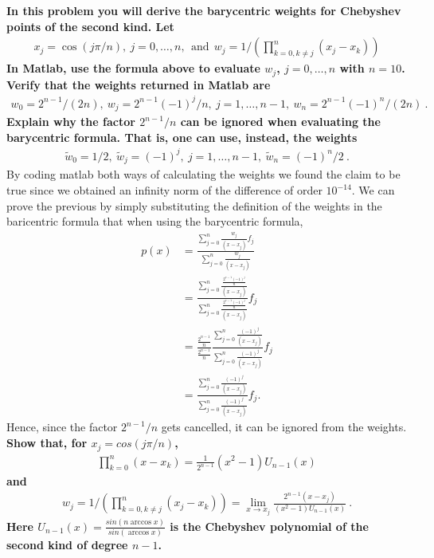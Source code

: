 \textbf{In this problem you will derive the barycentric weights for Chebyshev points of the second kind. Let}
\begin{align*}
x_j = \cos(j\pi /n),~j = 0,\dots,n,~~\text{and}~~w_j = 1/ \left( \prod_{k=0,k \neq j}^n (x_j - x_k) \right)
\end{align*}
\textbf{In Matlab, use the formula above to evaluate $w_j$, $j = 0, \dots, n$ with $n = 10$. Verify that the weights returned in Matlab are}
\begin{align}
w_0 = 2^{n-1}/(2n),~w_j = 2^{n-1}(-1)^j/n,~j = 1,\dots,n-1,~w_n = 2^{n-1}(-1)^n/(2n)~.
\end{align} 
\textbf{Explain why the factor $2^{n-1}/n$ can be ignored when evaluating the barycentric formula. That is, one can use, instead, the weights}
\begin{align*}
\tilde{w}_0 = 1/2,~\tilde{w}_j = (-1)^j, ~j = 1,\dots, n-1,~\tilde{w}_n = (-1)^n/2~.
\end{align*}
By coding matlab both ways of calculating the weights we found the claim to be true since we obtained an infinity norm of the difference of order $10^{-14}$. We can prove the previous by simply substituting the definition of the weights in the baricentric formula that when using the barycentric formula,
\begin{align*}
p(x) &= \frac{\sum_{j=0}^{n}\frac{w_j}{(x - x_j)}f_j}{\sum_{j=0}^{n}\frac{w_j}{(x - x_j)}}\\
&= \frac{\sum_{j=0}^{n}\frac{\frac{2^{n-1}(-1)^j}{n}}{(x - x_j)}}{\sum_{j=0}^{n}\frac{\frac{2^{n-1}(-1)^j}{n}}{(x - x_j)}}f_j\\
& = \frac{\frac{2^{n-1}}{n}}{\frac{2^{n-1}}{n}}\frac{\sum_{j=0}^{n}\frac{(-1)^j}{(x - x_j)}}{\sum_{j=0}^{n}\frac{(-1)^j}{(x - x_j)}}f_j \\
& = \frac{\sum_{j=0}^{n}\frac{(-1)^j}{(x - x_j)}}{\sum_{j=0}^{n}\frac{(-1)^j}{(x - x_j)}}f_j.
\end{align*}
Hence, since the factor $2^{n-1}/n$ gets cancelled, it can be ignored from the weights.
\newpage
\textbf{Show that, for $x_j = cos(j\pi/n)$,}
\begin{align*}
\prod_{k=0}^n(x - x_k) = \frac{1}{2^{n-1}}(x^2-1)U_{n-1}(x)
\end{align*} 
\textbf{and}
\begin{align*}
w_j = 1/ \left( \prod_{k=0,k \neq j}^n (x_j - x_k) \right) = \lim_{x \rightarrow x_j} \frac{2^{n-1}(x-x_j)}{(x^2 - 1)U_{n-1}(x)}~.
\end{align*}
\textbf{Here $U_{n-1}(x) = \frac{sin(n\arccos x)}{sin(\arccos x)}$ is the Chebyshev polynomial of the second kind of degree $n-1$.}

